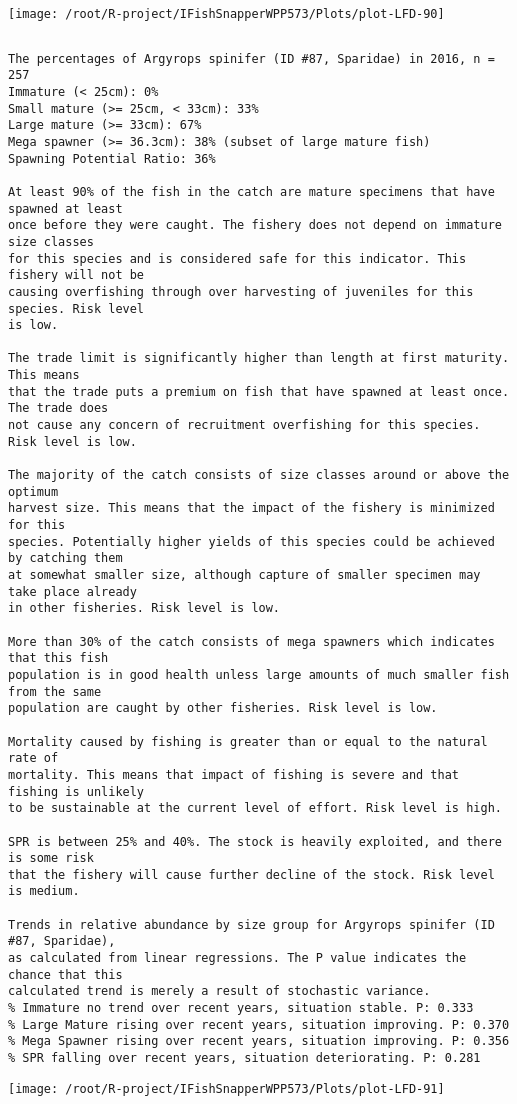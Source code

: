 \documentclass{report}\usepackage[]{graphicx}\usepackage[]{color}
\makeatletter
\def\maxwidth{ %
  \ifdim\Gin@nat@width>\linewidth
    \linewidth
  \else
    \Gin@nat@width
  \fi
}
\newenvironment{kframe}{%
 \def\at@end@of@kframe{}%
 \ifinner\ifhmode%
  \def\at@end@of@kframe{\end{minipage}}%
  \begin{minipage}{\columnwidth}%
 \fi\fi%
 \def\FrameCommand##1{\hskip\@totalleftmargin \hskip-\fboxsep
 \colorbox{shadecolor}{##1}\hskip-\fboxsep
     \hskip-\linewidth \hskip-\@totalleftmargin \hskip\columnwidth}%
 \MakeFramed {\advance\hsize-\width
   \@totalleftmargin\z@ \linewidth\hsize
   \@setminipage}}%
 {\par\unskip\endMakeFramed%
 \at@end@of@kframe}
\newenvironment{knitrout}{}{} %
\makeatother
\begin{document}
\begin{knitrout}
\texttt{[image: /root/R-project/IFishSnapperWPP573/Plots/plot-LFD-90]} 
\begin{kframe}\begin{verbatim}
\end{verbatim}
\end{kframe}
\clearpage
\newpage
\begin{kframe}\begin{verbatim}The percentages of Argyrops spinifer (ID #87, Sparidae) in 2016, n = 257
Immature (< 25cm): 0%
Small mature (>= 25cm, < 33cm): 33%
Large mature (>= 33cm): 67%
Mega spawner (>= 36.3cm): 38% (subset of large mature fish)
Spawning Potential Ratio: 36%
 
At least 90% of the fish in the catch are mature specimens that have spawned at least
once before they were caught. The fishery does not depend on immature size classes
for this species and is considered safe for this indicator. This fishery will not be
causing overfishing through over harvesting of juveniles for this species. Risk level
is low.

The trade limit is significantly higher than length at first maturity.  This means
that the trade puts a premium on fish that have spawned at least once. The trade does
not cause any concern of recruitment overfishing for this species. Risk level is low.

The majority of the catch consists of size classes around or above the optimum
harvest size. This means that the impact of the fishery is minimized for this
species. Potentially higher yields of this species could be achieved by catching them
at somewhat smaller size, although capture of smaller specimen may take place already
in other fisheries. Risk level is low.

More than 30% of the catch consists of mega spawners which indicates that this fish
population is in good health unless large amounts of much smaller fish from the same
population are caught by other fisheries. Risk level is low.
 
Mortality caused by fishing is greater than or equal to the natural rate of
mortality. This means that impact of fishing is severe and that fishing is unlikely
to be sustainable at the current level of effort. Risk level is high.
 
SPR is between 25% and 40%. The stock is heavily exploited, and there is some risk
that the fishery will cause further decline of the stock. Risk level is medium.
 
Trends in relative abundance by size group for Argyrops spinifer (ID #87, Sparidae),
as calculated from linear regressions. The P value indicates the chance that this
calculated trend is merely a result of stochastic variance.
% Immature no trend over recent years, situation stable. P: 0.333
% Large Mature rising over recent years, situation improving. P: 0.370
% Mega Spawner rising over recent years, situation improving. P: 0.356
% SPR falling over recent years, situation deteriorating. P: 0.281
\end{verbatim}
\end{kframe}
\texttt{[image: /root/R-project/IFishSnapperWPP573/Plots/plot-LFD-91]} 


\end{knitrout}
\end{document}
